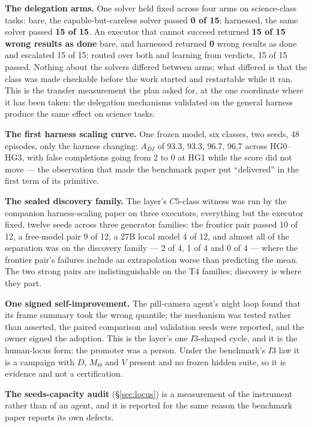 \textbf{The delegation arms.} One solver held fixed across four arms on science-class tasks: bare, the capable-but-careless solver passed \textbf{0 of 15}; harnessed, the same solver passed \textbf{15 of 15}. An executor that cannot succeed returned \textbf{15 of 15 wrong results as done} bare, and harnessed returned \textbf{0} wrong results as done and escalated 15 of 15; routed over both and learning from verdicts, 15 of 15 passed. Nothing about the solvers differed between arms; what differed is that the class was made checkable before the work started and restartable while it ran. This is the transfer measurement the plan asked for, at the one coordinate where it has been taken: the delegation mechanisms validated on the general harness produce the same effect on science tasks.

\textbf{The first harness scaling curve.} One frozen model, six classes, two seeds, 48 episodes, only the harness changing: $A_{DI}$ of 93.3, 93.3, 96.7, 96.7 across HG0--HG3, with false completions going from 2 to 0 at HG1 while the score did not move --- the observation that made the benchmark paper put ``delivered'' in the first term of its primitive.

\textbf{The sealed discovery family.} The layer's $C5$-class witness was run by the companion harness-scaling paper on three executors, everything but the executor fixed, twelve seeds across three generator families: the frontier pair passed 10 of 12, a free-model pair 9 of 12, a 27B local model 4 of 12, and almost all of the separation was on the discovery family --- 2 of 4, 1 of 4 and 0 of 4 --- where the frontier pair's failures include an extrapolation worse than predicting the mean. The two strong pairs are indistinguishable on the T4 families; discovery is where they part.

\textbf{One signed self-improvement.} The pill-camera agent's night loop found that its frame summary took the wrong quantile; the mechanism was tested rather than asserted, the paired comparison and validation seeds were reported, and the owner signed the adoption. This is the layer's one $I3$-shaped cycle, and it is the human-locus form: the promoter was a person. Under the benchmark's $I3$ law it is a campaign with $D$, $M_\Theta$ and $V$ present and no frozen hidden suite, so it is evidence and not a certification.

\textbf{The seeds-capacity audit} (\S\ref{sec:locus}) is a measurement of the instrument rather than of an agent, and it is reported for the same reason the benchmark paper reports its own defects.

